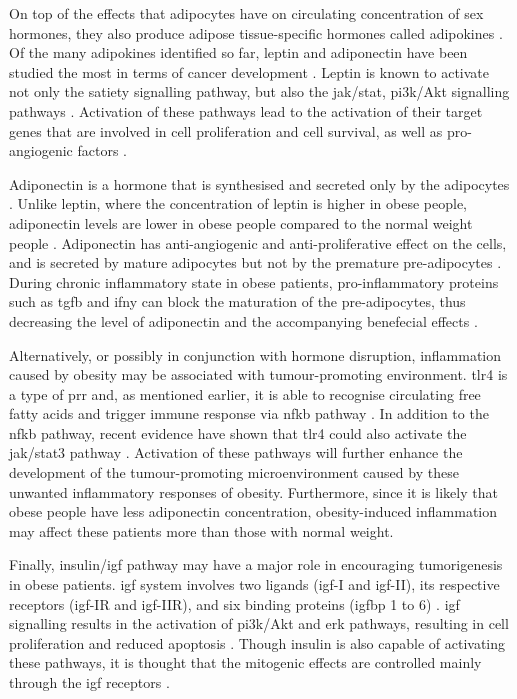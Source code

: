 On top of the effects that \glspl{adipocyte} have on circulating concentration of sex hormones, they also produce adipose tissue-specific hormones called adipokines \citep{Roberts2010}.
Of the many adipokines identified so far, leptin and adipo\-nectin have been studied the most in terms of cancer development \citep{Renehan2006,Roberts2010}.
Leptin is known to activate not only the satiety signalling pathway, but also the \gls{jak}/\gls{stat}, \gls{pi3k}/Akt signalling pathways \citep{Garofalo2006,Renehan2006}.
Activation of these pathways lead to the activation of their target genes that are involved in cell proliferation and cell survival, as well as pro-angiogenic factors \citep{Garofalo2006}.

Adiponectin is a hormone that is synthesised and secreted only by the \glspl{adipocyte} \citep{Kelesidis2006a}.
Unlike leptin, where the concentration of leptin is higher in obese people, adiponectin levels are lower in obese people compared to the normal weight people \citep{Kelesidis2006a,Renehan2006}.
Adiponectin has anti-angiogenic and anti-proliferative effect on the cells, and is secreted by mature adipocytes but not by the premature pre-adipocytes \citep{Gilbert2013}.
During chronic inflammatory state in obese patients, pro-inflammatory proteins such as \gls{tgfb} and \gls{ifny} can block the maturation of the pre-adipocytes, thus decreasing the level of adiponectin and the accompanying benefecial effects \citep{Gilbert2013}.

Alternatively, or possibly in conjunction with hormone disruption, inflammation caused by obesity may be associated with tumour-promoting environment.
\Gls{tlr}4 is a type of \gls{prr} and, as mentioned earlier, it is able to recognise circulating free fatty acids and trigger immune response via \gls{nfkb} pathway \citep{Lumeng2011}.
In addition to the \gls{nfkb} pathway, recent evidence have shown that \gls{tlr}4 could also activate the \gls{jak}/\gls{stat3} pathway \citep{Yu2014}.
Activation of these pathways will further enhance the development of the tumour-promoting microenvironment caused by these unwanted inflammatory responses of obesity.
Furthermore, since it is likely that obese people have less adiponectin concentration, obesity-induced inflammation may affect these patients more than those with normal weight.

Finally, insulin/\gls{igf} pathway may have a major role in encouraging tumorigenesis in obese patients.
\Gls{igf} system involves two ligands (\gls{igf}-I and \gls{igf}-II), its respective receptors (\gls{igf}-IR and \gls{igf}-IIR), and six binding proteins (\gls{igfbp} 1 to 6) \citep{Roberts2010}.
\gls{igf} signalling results in the activation of \gls{pi3k}/Akt and \gls{erk} pathways, resulting in cell proliferation and reduced apoptosis \citep{Roberts2010}.
Though insulin is also capable of activating these pathways, it is thought that the mitogenic effects are controlled mainly through the \gls{igf} receptors \citep{Roberts2010}.

